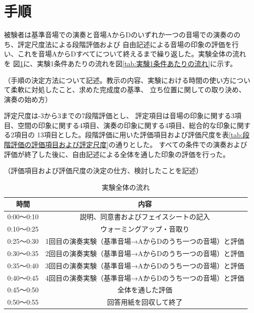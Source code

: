 \documentclass[11pt,a4j]{jreport}
\begin{document}
\clearpage

\section{手順}

被験者は基準音場での演奏と音場AからDのいずれか一つの音場での演奏ののち、評定尺度法による段階評価および
自由記述による音場の印象の評価を行い、これを音場AからDすべてについて終えるまで繰り返した。実験全体の流れを
図\ref{tab:実験全体の流れ}に、実験1条件あたりの流れを図\ref{tab:実験1条件あたりの流れ}に示す。

（手順の決定方法について記述。教示の内容、実験における時間の使い方について柔軟に対処したこと、求めた完成度の基準、
立ち位置に関しての取り決め、演奏の始め方）


評定尺度は-3から3までの7段階評価とし、
評定項目は音場の印象に関する3項目、空間の印象に関する4項目、演奏の印象に関する4項目、総合的な印象に関する2項目の
13項目とした。段階評価に用いた評価項目および評価尺度を表\ref{tab:段階評価の評価項目および評定尺度}の通りとした。
すべての条件での演奏および評価が終了した後に、自由記述による全体を通した印象の評価を行った。

（評価項目および評価尺度の決定の仕方、検討したことを記述）



\clearpage

\begin{table}[H]
  \centering
  \caption{実験全体の流れ}
  \label{tab:実験全体の流れ}

  \begingroup
  \renewcommand{\arraystretch}{1.2}

  \begin{tabular}{|c|c|}
    時間 & 内容 \\
    \hline
    0:00〜0:10 & 説明、同意書およびフェイスシートの記入 \\
    0:10〜0:25 & ウォーミングアップ・音取り \\
    0:25〜0:30 & 1回目の演奏実験（基準音場→AからDのうち一つの音場）と評価 \\
    0:30〜0:35 & 2回目の演奏実験（基準音場→AからDのうち一つの音場）と評価 \\
    0:35〜0:40 & 3回目の演奏実験（基準音場→AからDのうち一つの音場）と評価 \\
    0:40〜0:45 & 4回目の演奏実験（基準音場→AからDのうち一つの音場）と評価 \\
    0:45〜0:50 & 全体を通した評価\\
    0:50〜0:55 & 回答用紙を回収して終了 \\
  \end{tabular}
  \endgroup
\end{table}
\end{document}
